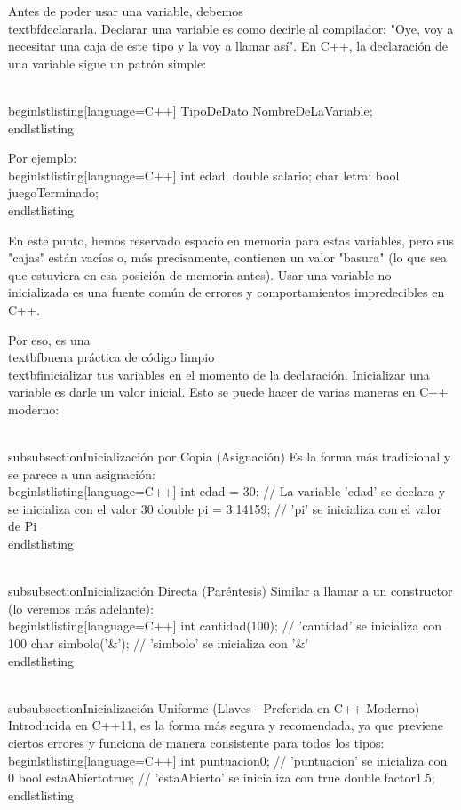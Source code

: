 Antes de poder usar una variable, debemos \\textbf{declararla}. Declarar una variable es como decirle al compilador: "Oye, voy a necesitar una caja de este tipo y la voy a llamar así". En C++, la declaración de una variable sigue un patrón simple:

\\begin{lstlisting}[language=C++]
TipoDeDato NombreDeLaVariable;
\\end{lstlisting}

Por ejemplo:
\\begin{lstlisting}[language=C++]
int edad;
double salario;
char letra;
bool juegoTerminado;
\\end{lstlisting}

En este punto, hemos reservado espacio en memoria para estas variables, pero sus "cajas" están vacías o, más precisamente, contienen un valor "basura" (lo que sea que estuviera en esa posición de memoria antes). Usar una variable no inicializada es una fuente común de errores y comportamientos impredecibles en C++.

Por eso, es una \\textbf{buena práctica de código limpio} \\textbf{inicializar} tus variables en el momento de la declaración. Inicializar una variable es darle un valor inicial. Esto se puede hacer de varias maneras en C++ moderno:

\\subsubsection{Inicialización por Copia (Asignación)}
Es la forma más tradicional y se parece a una asignación:
\\begin{lstlisting}[language=C++]
int edad = 30; // La variable 'edad' se declara y se inicializa con el valor 30
double pi = 3.14159; // 'pi' se inicializa con el valor de Pi
\\end{lstlisting}

\\subsubsection{Inicialización Directa (Paréntesis)}
Similar a llamar a un constructor (lo veremos más adelante):
\\begin{lstlisting}[language=C++]
int cantidad(100); // 'cantidad' se inicializa con 100
char simbolo('&'); // 'simbolo' se inicializa con '&'
\\end{lstlisting}

\\subsubsection{Inicialización Uniforme (Llaves - Preferida en C++ Moderno)}
Introducida en C++11, es la forma más segura y recomendada, ya que previene ciertos errores y funciona de manera consistente para todos los tipos:
\\begin{lstlisting}[language=C++]
int puntuacion{0}; // 'puntuacion' se inicializa con 0
bool estaAbierto{true}; // 'estaAbierto' se inicializa con true
double factor{1.5};
\\end{lstlisting}

